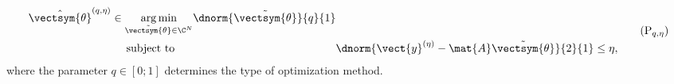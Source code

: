 \begin{equation}
\begin{alignedat}{2}
  \hat{\vectsym{\theta}}^{(q, \eta)}
  &\in
  \underset{ \tilde{\vectsym{\theta}} \in \C^{ N } }{ \arg\min }
  \dnorm{ \tilde{\vectsym{\theta}} }{q}{1}\\
  &
  \mspace{24.5mu}
  \text{subject to}
  &
  \dnorm{ \vect{y}^{(\eta)} - \mat{A} \tilde{\vectsym{\theta}} }{2}{1}
  &\leq
  \eta,
\end{alignedat}
\tag{$\text{P}_{q, \eta}$}
\label{eqn:cs_lq_minimization}
\end{equation}
where
the parameter
$q \in [ 0; 1 ]$ determines
the type of
optimization method.
